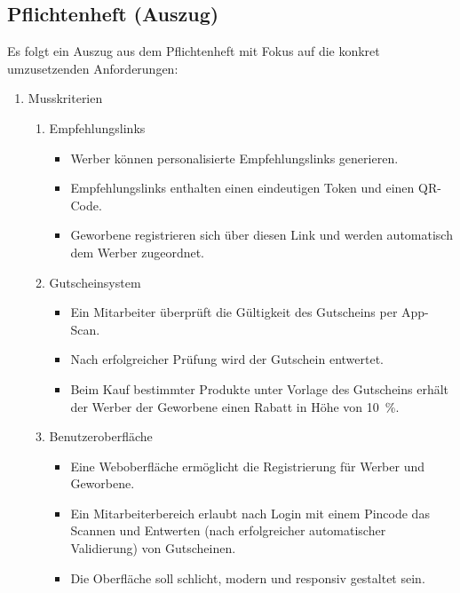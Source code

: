 \subsection{Pflichtenheft (Auszug)}
\label{app:Pflichtenheft}
Es folgt ein Auszug aus dem Pflichtenheft mit Fokus auf die konkret umzusetzenden Anforderungen:

\begin{enumerate}[itemsep=0em,partopsep=0em,parsep=0em,topsep=0em]
    \item Musskriterien
    \begin{enumerate}
        \item Empfehlungslinks
        \begin{itemize}
            \item Werber können personalisierte Empfehlungslinks generieren.
            \item Empfehlungslinks enthalten einen eindeutigen Token und einen QR-Code.
            \item Geworbene registrieren sich über diesen Link und werden automatisch dem Werber zugeordnet.
        \end{itemize}

        \item Gutscheinsystem
        \begin{itemize}
            \item Ein Mitarbeiter überprüft die Gültigkeit des Gutscheins per App-Scan.
            \item Nach erfolgreicher Prüfung wird der Gutschein entwertet.
            \item Beim Kauf bestimmter Produkte unter Vorlage des Gutscheins erhält der Werber \bzw der Geworbene einen Rabatt in Höhe von \SI{10}{\percent}.
        \end{itemize}

        \item Benutzeroberfläche
        \begin{itemize}
            \item Eine Weboberfläche ermöglicht die Registrierung für Werber und Geworbene.
            \item Ein Mitarbeiterbereich erlaubt nach Login mit einem Pincode das Scannen und Entwerten (nach erfolgreicher automatischer Validierung) von Gutscheinen.
            \item Die Oberfläche soll schlicht, modern und responsiv gestaltet sein.
        \end{itemize}


\end{enumerate}
\end{enumerate}
